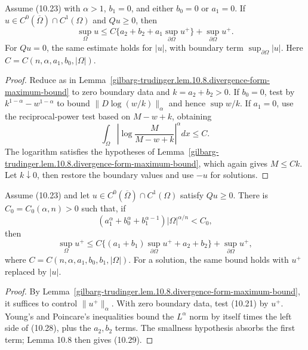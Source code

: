 \begin{theorem}
\label{gilbarg-trudinger.thm.10.9.divergence-form-apriori-estimate}
Assume \textup{(10.23)} with $\alpha>1$, $b_1=0$, and either $b_0=0$
or $a_1=0$.  If $u\in C^0(\overline\Omega)\cap C^1(\Omega)$ and
$Qu\ge0$, then
\begin{equation}
\sup_\Omega u\le C\{a_2+b_2+a_1\sup_{\partial\Omega}u^+\}
+\sup_{\partial\Omega}u^+.
\tag{10.26}
\end{equation}
For $Qu=0$, the same estimate holds for $|u|$, with boundary term
$\sup_{\partial\Omega}|u|$.  Here
$C=C(n,\alpha,a_1,b_0,|\Omega|)$.
\end{theorem}
\begin{proof}
\sketch Reduce as in Lemma~\ref{gilbarg-trudinger.lem.10.8.divergence-form-maximum-bound}
to zero boundary data and $k=a_2+b_2>0$.  If $b_0=0$, test by
$k^{1-\alpha}-w^{1-\alpha}$ to bound
$\|D\log(w/k)\|_\alpha$ and hence $\sup w/k$.  If $a_1=0$, use
the reciprocal-power test based on $M-w+k$, obtaining
\begin{equation}
\int_\Omega\left|\log\frac{M}{M-w+k}\right|^\alpha dx\le C.
\tag{10.27}
\end{equation}
The logarithm satisfies the hypotheses of Lemma~\ref{gilbarg-trudinger.lem.10.8.divergence-form-maximum-bound},
which again gives $M\le Ck$.  Let $k\downarrow0$, then restore the boundary
values and use $-u$ for solutions.
\end{proof}

\begin{theorem}
\label{gilbarg-trudinger.thm.10.10.small-data-divergence-form-bound}
Assume \textup{(10.23)} and let
$u\in C^0(\overline\Omega)\cap C^1(\Omega)$ satisfy $Qu\ge0$.  There is
$C_0=C_0(\alpha,n)>0$ such that, if
\begin{equation}
(a_1^\alpha+b_0^\alpha+b_1^{\alpha-1})|\Omega|^{\alpha/n}<C_0,
\tag{10.28}
\end{equation}
then
\begin{equation}
\sup_\Omega u^+\le
C\{(a_1+b_1)\sup_{\partial\Omega}u^++a_2+b_2\}
+\sup_{\partial\Omega}u^+,
\tag{10.29}
\end{equation}
where $C=C(n,\alpha,a_1,b_0,b_1,|\Omega|)$.  For a solution, the same
bound holds with $u^+$ replaced by $|u|$.
\end{theorem}
\begin{proof}
\sketch By Lemma~\ref{gilbarg-trudinger.lem.10.8.divergence-form-maximum-bound},
it suffices to control $\|u^+\|_\alpha$.  With zero boundary data, test
\textup{(10.21)} by $u^+$.  Young's and Poincare's inequalities bound the
$L^\alpha$ norm by itself times the left side of \textup{(10.28)}, plus
the $a_2,b_2$ terms.  The smallness hypothesis absorbs the first term;
Lemma 10.8 then gives \textup{(10.29)}.
\end{proof}

